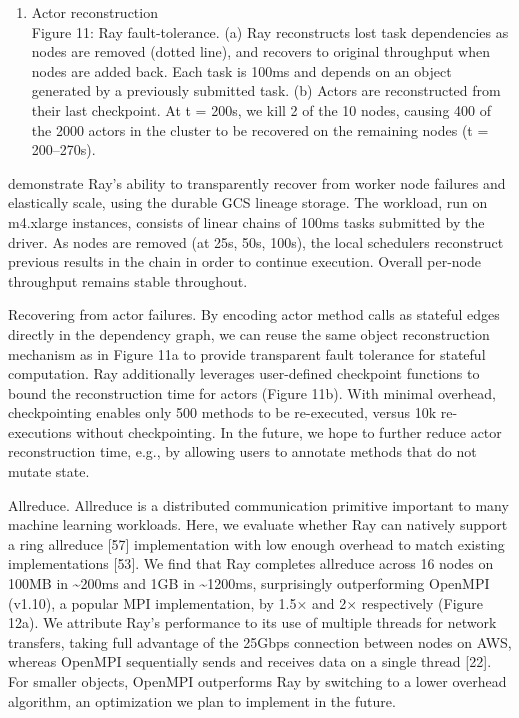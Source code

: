 \documentclass[
]{article}
\providecommand{\tightlist}{%
  \setlength{\itemsep}{0pt}\setlength{\parskip}{0pt}}
\begin{document}
\begin{enumerate}
\def\labelenumi{(\alph{enumi})}
\setcounter{enumi}{1}
\tightlist
\item
  Actor reconstruction\\
  Figure 11: Ray fault-tolerance. (a) Ray reconstructs lost task
  dependencies as nodes are removed (dotted line), and recovers to
  original throughput when nodes are added back. Each task is 100ms and
  depends on an object generated by a previously submitted task. (b)
  Actors are reconstructed from their last checkpoint. At t = 200s, we
  kill 2 of the 10 nodes, causing 400 of the 2000 actors in the cluster
  to be recovered on the remaining nodes (t = 200--270s).
\end{enumerate}

demonstrate Ray's ability to transparently recover from worker node
failures and elastically scale, using the durable GCS lineage storage.
The workload, run on m4.xlarge instances, consists of linear chains of
100ms tasks submitted by the driver. As nodes are removed (at 25s, 50s,
100s), the local schedulers reconstruct previous results in the chain in
order to continue execution. Overall per-node throughput remains stable
throughout.

Recovering from actor failures. By encoding actor method calls as
stateful edges directly in the dependency graph, we can reuse the same
object reconstruction mechanism as in Figure 11a to provide transparent
fault tolerance for stateful computation. Ray additionally leverages
user-defined checkpoint functions to bound the reconstruction time for
actors (Figure 11b). With minimal overhead, checkpointing enables only
500 methods to be re-executed, versus 10k re-executions without
checkpointing. In the future, we hope to further reduce actor
reconstruction time, e.g., by allowing users to annotate methods that do
not mutate state.

Allreduce. Allreduce is a distributed communication primitive important
to many machine learning workloads. Here, we evaluate whether Ray can
natively support a ring allreduce {[}57{]} implementation with low
enough overhead to match existing implementations {[}53{]}. We find that
Ray completes allreduce across 16 nodes on 100MB in \textasciitilde200ms
and 1GB in \textasciitilde1200ms, surprisingly outperforming OpenMPI
(v1.10), a popular MPI implementation, by 1.5× and 2× respectively
(Figure 12a). We attribute Ray's performance to its use of multiple
threads for network transfers, taking full advantage of the 25Gbps
connection between nodes on AWS, whereas OpenMPI sequentially sends and
receives data on a single thread {[}22{]}. For smaller objects, OpenMPI
outperforms Ray by switching to a lower overhead algorithm, an
optimization we plan to implement in the future.
\end{document}
